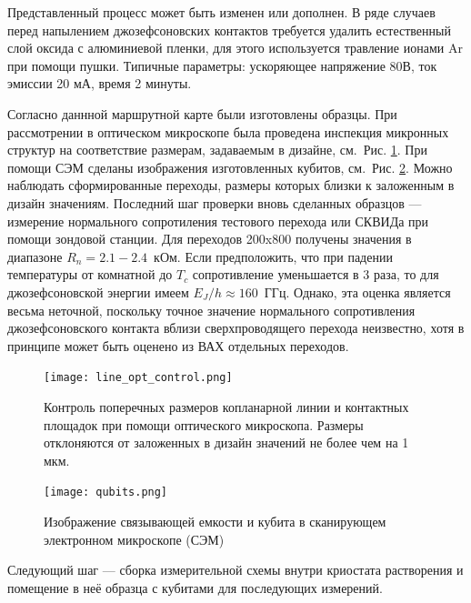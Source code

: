 Представленный процесс может быть изменен или дополнен. В ряде случаев перед напылением джозефсоновских контактов требуется удалить естественный слой оксида с алюминиевой пленки, для этого используется травление ионами Ar при помощи пушки. Типичные параметры: ускоряющее напряжение 80В, ток эмиссии 20 мА, время 2 минуты.

Согласно даннной маршрутной карте были изготовлены образцы. При рассмотрении в оптическом микроскопе была проведена инспекция микронных структур на соответствие размерам, задаваемым в дизайне, см.~Рис. \ref{img: line_opt_control}.  При помощи СЭМ сделаны изображения изготовленных кубитов, см.~Рис. \ref{img: qubits_sem}. Можно наблюдать сформированные переходы, размеры которых близки к заложенным в дизайн значениям. Последний шаг проверки вновь сделанных образцов --- измерение нормального сопротиления тестового перехода или СКВИДа при помощи зондовой станции. Для переходов 200x800 получены значения в диапазоне $R_n=2.1-2.4$~кОм. Если предположить, что при падении температуры от комнатной до $T_c$ сопротивление уменьшается в 3 раза, то для джозефсоновской энергии имеем $E_J/h \approx 160$~ГГц. Однако, эта оценка является весьма неточной, поскольку точное значение нормального сопротивления джозефсоновского контакта вблизи сверхпроводящего перехода неизвестно, хотя в принципе может быть оценено из ВАХ отдельных переходов. 
\begin{figure}[htb]\center
	\texttt{[image: line\_opt\_control.png]} \hfill
	\caption[Контроль размеров микронных структур в оптическом микроскопе]{Контроль поперечных размеров копланарной линии  и контактных площадок при помощи оптического микроскопа. Размеры отклоняются от заложенных в дизайн значений не более чем на 1 мкм.}
	\label{img: line_opt_control}
\end{figure}

\begin{figure}[htb]\center
	\texttt{[image: qubits.png]} \hfill
	\caption{Изображение связывающей емкости и кубита в сканирующем электронном микроскопе (СЭМ)}  
	\label{img: qubits_sem}
\end{figure}
Следующий шаг --- сборка измерительной схемы внутри криостата растворения и помещение в неё образца с кубитами для последующих измерений. 
